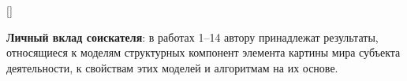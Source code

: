 \newpage
\renewcommand{\refname}{\Large Публикации автора по теме диссертации}
\titleformat{\subsection}[display]{}{}{}{\it}[]
\nocite{*}

\textbf{Личный вклад соискателя}: в работах 1--14 автору принадлежат результаты, относящиеся к моделям структурных компонент элемента картины мира субъекта деятельности, к свойствам этих моделей и алгоритмам на их основе.